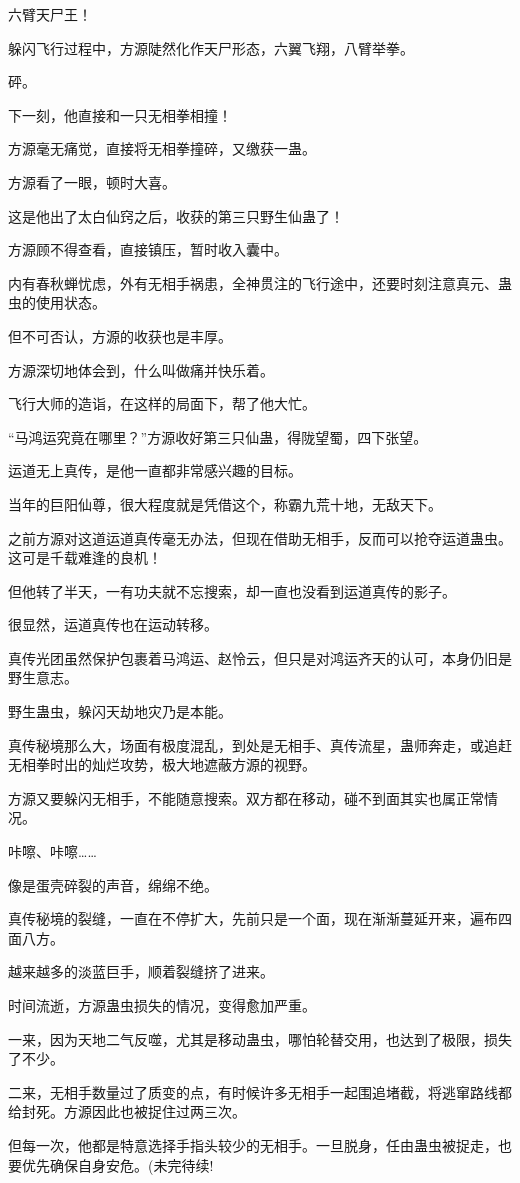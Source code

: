 \begin{this_body}
六臂天尸王！

躲闪飞行过程中，方源陡然化作天尸形态，六翼飞翔，八臂举拳。

砰。

下一刻，他直接和一只无相拳相撞！

方源毫无痛觉，直接将无相拳撞碎，又缴获一蛊。

方源看了一眼，顿时大喜。

这是他出了太白仙窍之后，收获的第三只野生仙蛊了！

方源顾不得查看，直接镇压，暂时收入囊中。

内有春秋蝉忧虑，外有无相手祸患，全神贯注的飞行途中，还要时刻注意真元、蛊虫的使用状态。

但不可否认，方源的收获也是丰厚。

方源深切地体会到，什么叫做痛并快乐着。

飞行大师的造诣，在这样的局面下，帮了他大忙。

“马鸿运究竟在哪里？”方源收好第三只仙蛊，得陇望蜀，四下张望。

运道无上真传，是他一直都非常感兴趣的目标。

当年的巨阳仙尊，很大程度就是凭借这个，称霸九荒十地，无敌天下。

之前方源对这道运道真传毫无办法，但现在借助无相手，反而可以抢夺运道蛊虫。这可是千载难逢的良机！

但他转了半天，一有功夫就不忘搜索，却一直也没看到运道真传的影子。

很显然，运道真传也在运动转移。

真传光团虽然保护包裹着马鸿运、赵怜云，但只是对鸿运齐天的认可，本身仍旧是野生意志。

野生蛊虫，躲闪天劫地灾乃是本能。

真传秘境那么大，场面有极度混乱，到处是无相手、真传流星，蛊师奔走，或追赶无相拳时出的灿烂攻势，极大地遮蔽方源的视野。

方源又要躲闪无相手，不能随意搜索。双方都在移动，碰不到面其实也属正常情况。

咔嚓、咔嚓……

像是蛋壳碎裂的声音，绵绵不绝。

真传秘境的裂缝，一直在不停扩大，先前只是一个面，现在渐渐蔓延开来，遍布四面八方。

越来越多的淡蓝巨手，顺着裂缝挤了进来。

时间流逝，方源蛊虫损失的情况，变得愈加严重。

一来，因为天地二气反噬，尤其是移动蛊虫，哪怕轮替交用，也达到了极限，损失了不少。

二来，无相手数量过了质变的点，有时候许多无相手一起围追堵截，将逃窜路线都给封死。方源因此也被捉住过两三次。

但每一次，他都是特意选择手指头较少的无相手。一旦脱身，任由蛊虫被捉走，也要优先确保自身安危。(未完待续!

\end{this_body}

